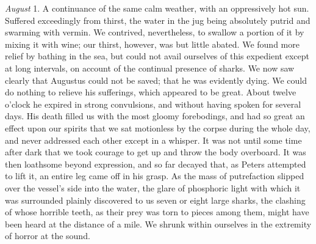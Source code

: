 \emph{August} 1. A continuance of the same calm weather, with an oppressively
hot sun. Suffered exceedingly from thirst, the water in the jug being absolutely
putrid and swarming with vermin. We contrived, nevertheless, to swallow a
portion of it by mixing it with wine; our thirst, however, was but little
abated. We found more relief by bathing in the sea, but could not avail
ourselves of this expedient except at long intervals, on account of the
continual presence of sharks. We now saw clearly that Augustus could not be
saved; that he was evidently dying. We could do nothing to relieve his
sufferings, which appeared to be great. About twelve o'clock he expired in
strong convulsions, and without having spoken for several days. His death filled
us with the most gloomy forebodings, and had so great an effect upon our spirits
that we sat motionless by the corpse during the whole day, and never addressed
each other except in a whisper. It was not until some time after dark that we
took courage to get up and throw the body overboard. It was then loathsome
beyond expression, and so far decayed that, as Peters attempted to lift it, an
entire leg came off in his grasp. As the mass of putrefaction slipped over the
vessel's side into the water, the glare of phosphoric light with which it was
surrounded plainly discovered to us seven or eight large sharks, the clashing of
whose horrible teeth, as their prey was torn to pieces among them, might have
been heard at the distance of a mile. We shrunk within ourselves in the
extremity of horror at the sound. 

